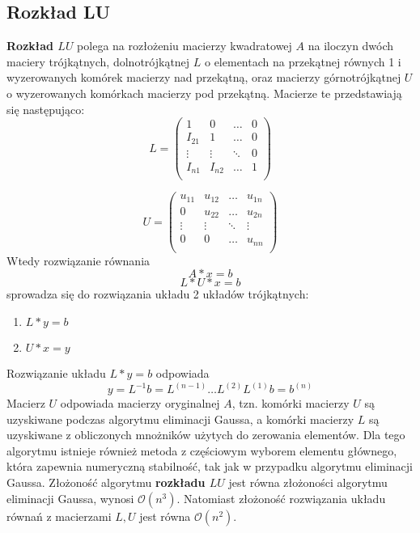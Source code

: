 \documentclass{article}
\begin{document}
\subsection{Rozkład LU}
\textbf{Rozkład $LU$} polega na rozłożeniu macierzy kwadratowej $A$ na iloczyn dwóch maciery trójkątnych, dolnotrójkątnej $L$ o elementach na przekątnej równych 1 i wyzerowanych komórek macierzy nad przekątną, oraz macierzy górnotrójkątnej $U$ o wyzerowanych komórkach macierzy pod przekątną. Macierze te przedstawiają się następująco:
\vspace{15pt}
$$ L = \begin{pmatrix}
1 & 0 & \dots & 0 \\
I_{21} & 1 & \dots & 0 \\
\vdots & \vdots & \ddots & 0 \\
I_{n1} & I_{n2} & \dots & 1 \\
\end{pmatrix} $$

\vspace{15pt}
$$ U = \begin{pmatrix}
u_{11} & u_{12} & \dots & u_{1n} \\
0 & u_{22} & \dots & u_{2n} \\
\vdots & \vdots & \ddots & \vdots \\
0 & 0 & \dots & u_{nn} \\
\end{pmatrix} $$
\vspace{15pt}
Wtedy rozwiązanie równania 
$$ A * x = b $$
$$ L * U * x = b $$
sprowadza się do rozwiązania układu 2 układów trójkątnych:
\begin{enumerate}
    \item $ L * y = b $
    \item $ U * x = y $
\end{enumerate}
Rozwiązanie układu $ L * y = b$ odpowiada 
$$ y = L^{-1}b = L^{(n - 1)} \dots L^{(2)}L^{(1)}b = b^{(n)} $$
Macierz $U$ odpowiada macierzy oryginalnej $A$, tzn. komórki macierzy $U$ są uzyskiwane podczas algorytmu eliminacji Gaussa, a komórki macierzy $L$ są uzyskiwane z obliczonych mnożników użytych do zerowania elementów. Dla tego algorytmu istnieje również metoda z częściowym wyborem elementu głównego, która zapewnia numeryczną stabilność, tak jak w przypadku algorytmu eliminacji Gaussa. Złożoność algorytmu \textbf{rozkładu $LU$} jest równa złożoności algorytmu eliminacji Gaussa, wynosi $\mathcal{O}(n^3)$. Natomiast złożoność rozwiązania układu równań z macierzami $L, U$ jest równa $\mathcal{O}(n^2)$.
\end{document}
